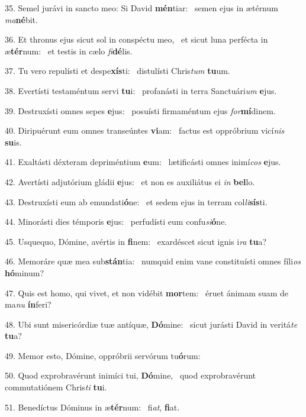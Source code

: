 35. Semel jurávi in sancto meo: Si David \textbf{mén}tiar: \ast\  semen ejus in ætérnum \textit{ma}\textbf{né}bit.\

36. Et thronus ejus sicut sol in conspéctu meo, \dag\  et sicut luna perfécta in æ\textbf{tér}num: \ast\  et testis in cælo \textit{fi}\textbf{dé}lis.\

37. Tu vero repulísti et despe\textbf{xís}ti: \ast\  distulísti Chris\textit{tum} \textbf{tu}um.\

38. Evertísti testaméntum servi \textbf{tu}i: \ast\  profanásti in terra Sanctuári\textit{um} \textbf{e}jus.\

39. Destruxísti omnes sepes \textbf{e}jus: \ast\  posuísti firmaméntum ejus \textit{for}\textbf{mí}dinem.\

40. Diripuérunt eum omnes transeúntes \textbf{vi}am: \ast\  factus est oppróbrium vicí\textit{nis} \textbf{su}is.\

41. Exaltásti déxteram depriméntium \textbf{e}um: \ast\  lætificásti omnes inimí\textit{cos} \textbf{e}jus.\

42. Avertísti adjutórium gládii \textbf{e}jus: \ast\  et non es auxiliátus ei \textit{in} \textbf{bel}lo.\

43. Destruxísti eum ab emundati\textbf{ó}ne: \ast\  et sedem ejus in terram col\textit{li}\textbf{sís}ti.\

44. Minorásti dies témporis \textbf{e}jus: \ast\  perfudísti eum confu\textit{si}\textbf{ó}ne.\

45. Usquequo, Dómine, avértis in \textbf{fi}nem: \ast\  exardéscet sicut ignis i\textit{ra} \textbf{tu}a?\

46. Memoráre quæ mea sub\textbf{stán}tia: \ast\  numquid enim vane constituísti omnes fíli\textit{os} \textbf{hó}minum?\

47. Quis est homo, qui vivet, et non vidébit \textbf{mor}tem: \ast\  éruet ánimam suam de ma\textit{nu} \textbf{ín}feri?\

48. Ubi sunt misericórdiæ tuæ antíquæ, \textbf{Dó}mine: \ast\  sicut jurásti David in veritá\textit{te} \textbf{tu}a?\

49. Memor esto, Dómine, oppróbrii servórum tu\textbf{ó}rum: \ast\  \

50. Quod exprobravérunt inimíci tui, \textbf{Dó}mine, \ast\  quod exprobravérunt commutatiónem Chris\textit{ti} \textbf{tu}i.\

51. Benedíctus Dóminus in æ\textbf{tér}num: \ast\  fi\textit{at}, \textbf{fi}at.\


